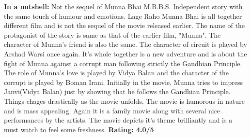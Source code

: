 \documentclass{article}
\begin{document}
\newline
\textbf{In a nutshell: }Not the sequel of Munna Bhai M.B.B.S. Independent story with the same touch of humour and emotions.
\newline
Lage Raho Munna Bhai \cite{lagerahomunnabhai}is all together different film and is not the sequel of the movie released earlier. The name of the protagonist of the story is same as that of the earlier film, "Munna". The character of Munna's friend is also the same. The character of circuit is played by Arshad Warsi once again. It's whole together is a new adventure and is about the fight of Munna against a corrupt man following strictly the Gandhian Principle. The role of Munna's love is played by Vidya Balan and the character of the corrupt is played by Boman Irani. Initially in the movie, Munna tries to impress Janvi(Vidya Balan) just by showing that he follows the Gandhian Principle. Things chages drastically as the movie unfolds. 
\newline
The movie is humorous in nature and is mass appealing. Again it is a family movie along with several nice performances by the artists. The movie depicts it's theme brilliantly and is a must watch to feel some freshness. \newline
\newline
\textbf{Rating: 4.0/5}
\newline
\end{document}
